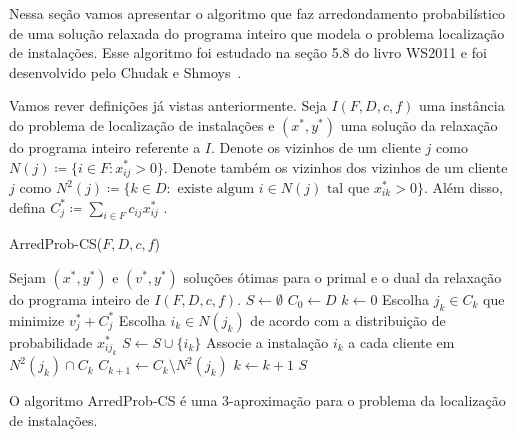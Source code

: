 Nessa seção vamos apresentar o algoritmo que faz arredondamento probabilístico de uma solução relaxada do programa inteiro que modela o problema localização de instalações. Esse algoritmo foi estudado na seção 5.8 do livro WS2011 e foi desenvolvido pelo Chudak e Shmoys~\cite{Chudak2003}.

Vamos rever definições já vistas anteriormente. 
Seja $I(F,D,c,f)$ uma instância do problema de localização de instalações e $(x^*,y^*)$ uma solução da relaxação do programa inteiro referente a $I$. 
Denote os vizinhos de um cliente $j$ como $N(j) \coloneqq\{i \in F : x^*_{ij} > 0\}$. 
Denote também os vizinhos dos vizinhos de um cliente $j$ como $N^2(j) \coloneqq \{ k \in D : \text{ existe algum } i \in N(j) \text{ tal que } x^*_{ik} > 0\}$.
Além disso, defina $C^*_j \coloneqq \sum_{i \in F} c_{ij}x^*_{ij}$ .

\begin{algorithm}[tbh]
\caption{\sc ArredProb-CS($F,D,c,f$)}
\begin{algorithmic}[1]
        \State Sejam $(x^*,y^*)$ e $(v^*,y^*)$ soluções ótimas para o primal e o dual da relaxação do programa inteiro de $I(F,D,c,f)$.
        \State $S \gets \emptyset$
        \State $C_0 \gets D$
        \State $k \gets 0$
        \State Escolha $j_k \in C_k$ que minimize $v^*_j + C^*_j$
        \State Escolha $i_k \in N(j_k)$ de acordo com a distribuição de probabilidade $x^*_{ij_k}$
        \State $S \gets S \cup \{i_k\}$
        \State Associe a instalação $i_k$ a cada cliente em $N^2(j_k) \cap C_k$
        \State $C_{k+1} \gets C_k \setminus N^2(j_k)$
        \State $k \gets k +1$
        \EndWhile
        \State \Return $S$
\end{algorithmic}
\end{algorithm}

\begin{theorem} O algoritmo {\sc ArredProb-CS} é uma 3-aproximação para o problema da localização de instalações.
\end{theorem}

